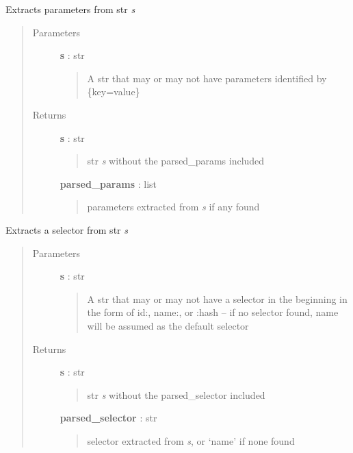 \documentclass[letterpaper,10pt,english]{sphinxmanual}
\begin{document}

\begin{fulllineitems}
\label{pytan.utils:pytan.utils.extract_params}
Extracts parameters from str \emph{s}
\begin{quote}\begin{description}
\item[{Parameters}] \leavevmode
\textbf{s} : str
\begin{quote}

A str that may or may not have parameters identified by \{key=value\}
\end{quote}

\item[{Returns}] \leavevmode
\textbf{s} : str
\begin{quote}

str \emph{s} without the parsed\_params included
\end{quote}

\textbf{parsed\_params} : list
\begin{quote}

parameters extracted from \emph{s} if any found
\end{quote}

\end{description}\end{quote}

\end{fulllineitems}


\begin{fulllineitems}
\label{pytan.utils:pytan.utils.extract_selector}
Extracts a selector from str \emph{s}
\begin{quote}\begin{description}
\item[{Parameters}] \leavevmode
\textbf{s} : str
\begin{quote}

A str that may or may not have a selector in the beginning in the form of id:, name:, or :hash -- if no selector found, name will be assumed as the default selector
\end{quote}

\item[{Returns}] \leavevmode
\textbf{s} : str
\begin{quote}

str \emph{s} without the parsed\_selector included
\end{quote}

\textbf{parsed\_selector} : str
\begin{quote}

selector extracted from \emph{s}, or `name' if none found
\end{quote}

\end{description}\end{quote}

\end{fulllineitems}
\end{document}

